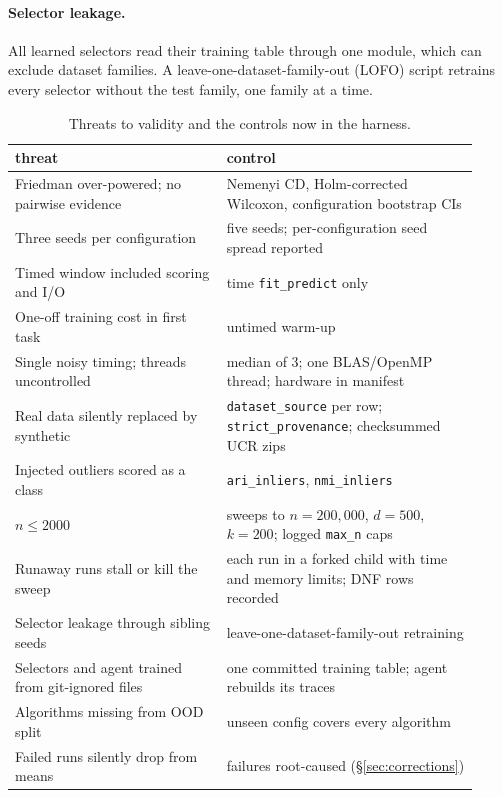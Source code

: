 \documentclass[11pt,a4paper]{article}
\newcommand{\code}[1]{\texttt{#1}}
\begin{document}
\paragraph{Selector leakage.} All learned selectors read their training table
through one module, which can exclude dataset families. A
leave-one-dataset-family-out (LOFO) script retrains every selector without
the test family, one family at a time.

\begin{table}[t]
  \centering\small
  \caption{Threats to validity and the controls now in the harness.}
  \label{tab:controls}
  \begin{tabular}{p{0.42\linewidth}p{0.5\linewidth}}
    \toprule
    threat & control \\
    \midrule
    Friedman over-powered; no pairwise evidence & Nemenyi CD, Holm-corrected Wilcoxon, configuration bootstrap CIs \\
    Three seeds per configuration & five seeds; per-configuration seed spread reported \\
    Timed window included scoring and I/O & time \code{fit\_predict} only \\
    One-off training cost in first task & untimed warm-up \\
    Single noisy timing; threads uncontrolled & median of 3; one BLAS/OpenMP thread; hardware in manifest \\
    Real data silently replaced by synthetic & \code{dataset\_source} per row; \code{strict\_provenance}; checksummed UCR zips \\
    Injected outliers scored as a class & \code{ari\_inliers}, \code{nmi\_inliers} \\
    $n \le 2000$ & sweeps to $n = 200{,}000$, $d = 500$, $k = 200$; logged \code{max\_n} caps \\
    Runaway runs stall or kill the sweep & each run in a forked child with time and memory limits; DNF rows recorded \\
    Selector leakage through sibling seeds & leave-one-dataset-family-out retraining \\
    Selectors and agent trained from git-ignored files & one committed training table; agent rebuilds its traces \\
    Algorithms missing from OOD split & unseen config covers every algorithm \\
    Failed runs silently drop from means & failures root-caused (\S\ref{sec:corrections}) \\
    \bottomrule
  \end{tabular}
\end{table}
\end{document}
